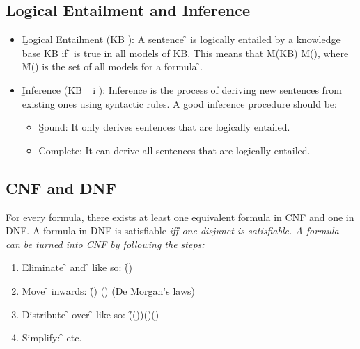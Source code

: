 \subsection{Logical Entailment and Inference}
\begin{itemize}
    \item \b{Logical Entailment} (\f{\textrm{KB} \models \alpha}): A sentence \f{\alpha} is logically entailed by a knowledge base KB if \f{\alpha} is true in all models of KB. This means that \f{M(\textrm{KB}) \subseteq M(\alpha)}, where \f{M(\phi)} is the set of all models for a formula \f{\phi}.
    \item \b{Inference} (\f{\textrm{KB} \vdash_i \alpha}): Inference is the process of deriving new sentences from existing ones using syntactic rules. A good inference procedure should be:
    \begin{itemize}
        \item \b{Sound:} It only derives sentences that are logically entailed.
        \item \b{Complete:} It can derive all sentences that are logically entailed.
    \end{itemize}
\end{itemize}

\subsection{CNF and DNF}
For every formula, there exists at least one equivalent formula in CNF and one in DNF. A formula in DNF is satisfiable \it{iff} one disjunct is satisfiable.
A formula can be turned into CNF by following the steps:
\begin{enumerate}
    \item Eliminate \f{\Rightarrow} and \f{\Leftrightarrow} like so: \f{\alpha \Rightarrow \beta \rightarrow (\neg\alpha \vee \beta)}
    \item Move \f{\neg} inwards: \f{\neg (\alpha \wedge \beta) \rightarrow (\neg\alpha\vee\neg\beta)} (De Morgan's laws)
    \item Distribute \f{\vee} over \f{\wedge} like so: \f{((\alpha\wedge\beta)\vee\gamma)\rightarrow (\alpha\vee\beta)\wedge (\beta\vee\gamma)}
    \item Simplify: \f{\alpha\vee\alpha\rightarrow\alpha} etc.
\end{enumerate}

